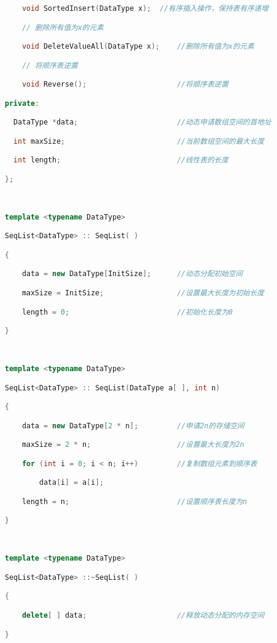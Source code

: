 \begin{lstlisting}[language=C++]
    void SortedInsert(DataType x);  //有序插入操作，保持表有序递增

    // 删除所有值为x的元素

    void DeleteValueAll(DataType x);    //删除所有值为x的元素

    // 将顺序表逆置

    void Reverse();                     //将顺序表逆置

private:

  DataType *data;                       //动态申请数组空间的首地址

  int maxSize;                          //当前数组空间的最大长度

  int length;                           //线性表的长度

};

  

template <typename DataType>  

SeqList<DataType> :: SeqList( )

{

    data = new DataType[InitSize];      //动态分配初始空间

    maxSize = InitSize;                 //设置最大长度为初始长度

    length = 0;                         //初始化长度为0

}

  

template <typename DataType>  

SeqList<DataType> :: SeqList(DataType a[ ], int n)

{

    data = new DataType[2 * n];         //申请2n的存储空间

    maxSize = 2 * n;                    //设置最大长度为2n

    for (int i = 0; i < n; i++)         //复制数组元素到顺序表

        data[i] = a[i];

    length = n;                         //设置顺序表长度为n

}

  

template <typename DataType>  

SeqList<DataType> ::~SeqList( )

{

    delete[ ] data;                     //释放动态分配的内存空间

}

  


\end{lstlisting}

